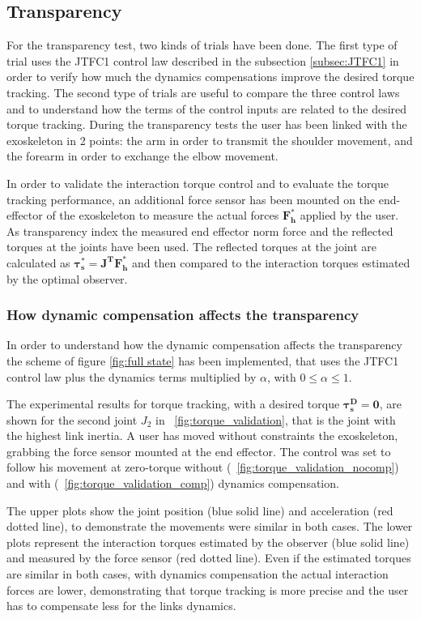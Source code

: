 \documentclass[journal]{IEEEtran}
\newcommand{\vects}[1]{{\boldsymbol {#1}}}
\begin{document}
\subsection{Transparency} \label{subsec:transparency}

For the transparency test, two kinds of trials have been done.
The first type of trial uses the JTFC1 control law described in the subsection \ref{subsec:JTFC1} in order to verify how much the dynamics compensations improve the desired torque tracking.
The second type of trials are useful to compare the three control laws and to understand how the terms of the control inputs are related to the desired torque tracking.
During the transparency tests the user has been linked with the exoskeleton in 2 points: the arm in order to transmit the shoulder movement, and the forearm in order to exchange the elbow movement.
\par In order to validate the interaction torque control and to evaluate the torque tracking performance, an additional force sensor has been mounted on the end-effector of the exoskeleton to measure the actual forces $\vects{F_h^*}$  applied by the user. 
As transparency index the measured end effector norm force and the reflected torques at the joints have been used.
The reflected torques at the joint are calculated as $\vects{\tau_s^*}=\vects{J^T F_h^*}$ and then compared to the interaction torques estimated by the optimal observer.

\subsubsection{How dynamic compensation affects the transparency} \label{subsubsec:compensationAndTransparency}

In order to understand how the dynamic compensation affects the transparency the scheme of figure \ref{fig:full state} has been implemented, that uses the JTFC1 control law plus the dynamics terms multiplied by $\alpha$, with $0 \leq \alpha \leq 1$.

The experimental results for torque tracking, with a desired torque $\vects{\tau_s^D=0}$, are shown for the second joint $J_2$ in \figurename \ \ref{fig:torque_validation}, that is the joint with the highest link inertia. A user has moved without constraints the exoskeleton, grabbing the force sensor mounted at the end effector. The control was set to follow his movement at zero-torque without (\figurename \ \ref{fig:torque_validation_nocomp}) and with (\figurename \ \ref{fig:torque_validation_comp}) dynamics compensation. 
\par The upper plots show the joint position (blue solid line) and acceleration (red dotted line), to demonstrate the movements were similar in both cases. The lower plots represent the interaction torques estimated by the observer (blue solid line) and measured by the force sensor (red dotted line). Even if the estimated torques are similar in both cases, with dynamics compensation the actual interaction forces are lower, demonstrating that torque tracking is more precise and the user has to compensate less for the links dynamics.
\end{document}
